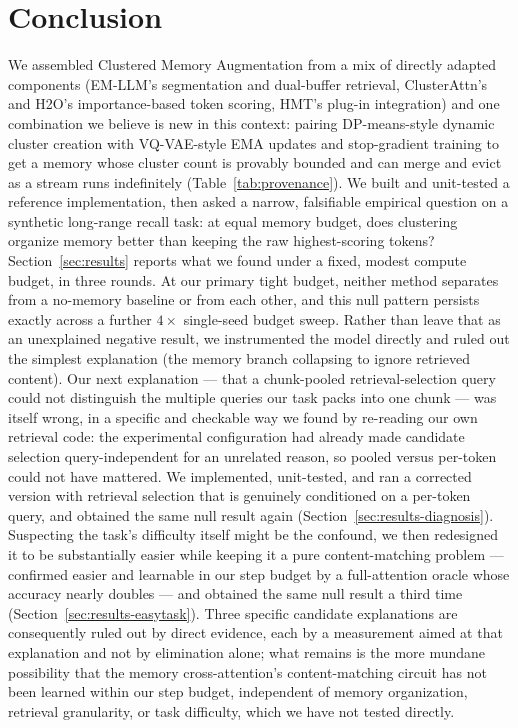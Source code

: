 \documentclass[11pt]{article}
\begin{document}
\section{Conclusion}

We assembled Clustered Memory Augmentation from a mix of directly adapted components (EM-LLM's
segmentation and dual-buffer retrieval, ClusterAttn's and H2O's importance-based token scoring,
HMT's plug-in integration) and one combination we believe is new in this context: pairing
DP-means-style dynamic cluster creation with VQ-VAE-style EMA updates and stop-gradient training
to get a memory whose cluster count is provably bounded and can merge and evict as a stream runs
indefinitely (Table~\ref{tab:provenance}). We built and unit-tested a reference implementation,
then asked a narrow, falsifiable empirical question on a synthetic long-range recall task: at
equal memory budget, does clustering organize memory better than keeping the raw highest-scoring
tokens? Section~\ref{sec:results} reports what we found under a fixed, modest compute budget, in
three rounds. At our primary tight budget, neither method separates from a no-memory baseline or
from each other, and this null pattern persists exactly across a further $4\times$ single-seed
budget sweep. Rather than leave that as an unexplained negative result, we instrumented the model
directly and ruled out the simplest explanation (the memory branch collapsing to ignore retrieved
content). Our next explanation --- that a chunk-pooled retrieval-selection query could not
distinguish the multiple queries our task packs into one chunk --- was itself wrong, in a specific
and checkable way we found by re-reading our own retrieval code: the experimental configuration
had already made candidate selection query-independent for an unrelated reason, so pooled versus
per-token could not have mattered. We implemented, unit-tested, and ran a corrected version with
retrieval selection that is genuinely conditioned on a per-token query, and obtained the same null
result again (Section~\ref{sec:results-diagnosis}). Suspecting the task's difficulty itself might
be the confound, we then redesigned it to be substantially easier while keeping it a pure
content-matching problem --- confirmed easier and learnable in our step budget by a full-attention
oracle whose accuracy nearly doubles --- and obtained the same null result a third time
(Section~\ref{sec:results-easytask}). Three specific candidate explanations are consequently ruled
out by direct evidence, each by a measurement aimed at that explanation and not by elimination
alone; what remains is the more mundane possibility that the memory cross-attention's
content-matching circuit has not been learned within our step budget, independent of memory
organization, retrieval granularity, or task difficulty, which we have not tested directly.
\end{document}
